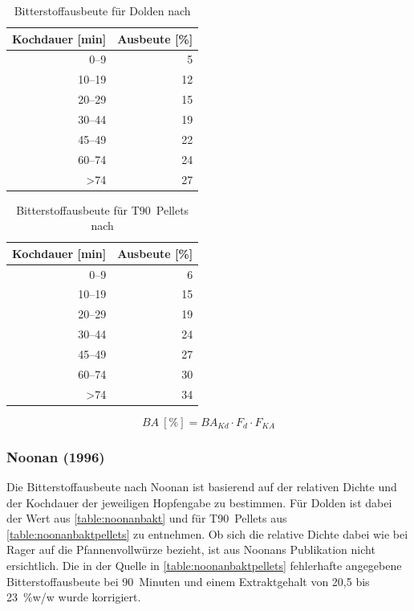 \documentclass[a4paper,parskip=half]{scrartcl}
\newcommand{\BA}{\mathit{BA}}
\newcommand{\BAKt}{{\mathit{BA}}_{\mathit{Kd}}}
\newcommand{\uper}{\:[\text{\%}]}
\newcommand{\FKd}{F_{\mathit{d}}}
\newcommand{\FHR}{F_{\mathit{KA}}}
\begin{document}
\begin{table}[H]
\centering
\begin{tabular}{rr}
\toprule
\multicolumn{1}{c}{\textbf{Kochdauer [min]}} & \multicolumn{1}{c}{\textbf{Ausbeute [\%]}} \\
\midrule
0–9            & 5  \\
10–19          & 12 \\
20–29          & 15 \\
30–44          & 19 \\
45–49          & 22 \\
60–74          & 24 \\
>74            & 27 \\
\bottomrule
\end{tabular}
\caption{Bitterstoffausbeute für Dolden nach \citeauthor{Daniels1996} \parencite[80]{Daniels1996}}
\label{table:danielsbakt}
\end{table}

\begin{table}[H]
\centering
\begin{tabular}{rr}
\toprule
\multicolumn{1}{c}{\textbf{Kochdauer [min]}} & \multicolumn{1}{c}{\textbf{Ausbeute [\%]}} \\
\midrule
0–9            & 6 \\
10–19          & 15 \\
20–29          & 19 \\
30–44          & 24 \\
45–49          & 27 \\
60–74          & 30 \\
>74            & 34 \\
\bottomrule
\end{tabular}
\caption{Bitterstoffausbeute für T90~Pellets nach \citeauthor{Daniels1996} \parencite[80]{Daniels1996}}
\label{table:danielsbaktpellets}
\end{table}

\begin{equation}
\BA \uper = \BAKt \cdot \FKd \cdot \FHR
\label{eq:danielsba}
\end{equation}


\subsubsection*{Noonan (1996)}

Die Bitterstoffausbeute nach Noonan ist basierend auf der relativen Dichte und der Kochdauer der jeweiligen Hopfengabe zu bestimmen. Für Dolden ist dabei der Wert aus \autoref{table:noonanbakt} und für T90~Pellets aus \autoref{table:noonanbaktpellets} zu entnehmen. Ob sich die relative Dichte dabei wie bei Rager auf die Pfannenvollwürze bezieht, ist aus Noonans Publikation nicht ersichtlich. Die in der Quelle in \autoref{table:noonanbaktpellets} fehlerhafte angegebene Bitterstoffausbeute bei 90~Minuten und einem Extraktgehalt von 20,5 bis 23~\%w/w wurde korrigiert.
\end{document}
